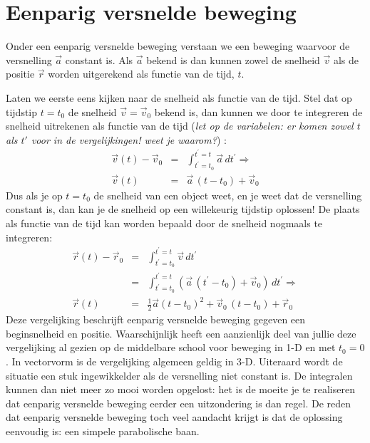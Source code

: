 \section{Eenparig versnelde beweging} \label{sec:eenparig}

Onder een eenparig versnelde beweging verstaan we een beweging waarvoor de
versnelling $\vec{a}$ constant is. Als $\vec{a}$ bekend is dan kunnen zowel de snelheid
$\vec{v}$ als de positie $\vec{r}$ worden uitgerekend als functie van de tijd, $t$. 

Laten we eerste eens kijken naar de snelheid als functie van de tijd. Stel dat op tijdstip
$t=t_0$ de snelheid $\vec{v}=\vec{v}_0$ bekend is, dan kunnen we door te integreren de 
snelheid uitrekenen als functie van de tijd ({\it let op de variabelen: er komen zowel $t$ als $t'$
voor in de vergelijkingen! weet je waarom?}) :
\begin{eqnarray}
\vec{v}(t) - \vec{v}_0 & = & \int_{t^{'}=t_0}^{t^{'}=t} \vec{a} \, dt^{'} \Rightarrow \\
\vec{v}(t)                     & =  & \vec{a} \, (t-t_0) + \vec{v}_0
\end{eqnarray}
Dus als je op $t=t_0$ de snelheid van een object weet, en je weet dat de versnelling constant is,
dan kan je de snelheid op een willekeurig tijdstip oplossen! De plaats als functie van de tijd 
kan worden bepaald door de snelheid nogmaals te integreren:
\begin{eqnarray}
\vec{r}(t) - \vec{r}_0 & = & \int_{t^{'}=t_0}^{t^{'}=t} \vec{v}\,dt^{'} \\
                                   & = &  \int_{t^{'}=t_0}^{t^{'}=t}  (\vec{a} \, (t^{'}-t_0) + \vec{v}_0) \,dt^{'} \Rightarrow \\
\vec{r}(t)                    & = & \frac{1}{2} \vec{a} (t-t_0)^2 +\vec{v}_0 \,(t-t_0) + \vec{r}_0 \label{eq:rt}
\end{eqnarray}
Deze vergelijking beschrijft eenparig versnelde beweging gegeven een beginsnelheid en positie. 
Waarschijnlijk heeft een aanzienlijk deel van jullie deze vergelijking al gezien op de middelbare school 
voor beweging in 1-D en met $t_0=0$.  In vectorvorm is de vergelijking algemeen geldig in 3-D.
Uiteraard wordt de situatie een stuk ingewikkelder als de versnelling niet constant
is. De integralen kunnen dan niet meer zo mooi worden opgelost: het is de moeite je te realiseren
dat eenparig versnelde beweging eerder een uitzondering is dan regel. De reden dat eenparig
versnelde beweging toch veel aandacht krijgt is dat de oplossing eenvoudig is: een simpele parabolische baan.

